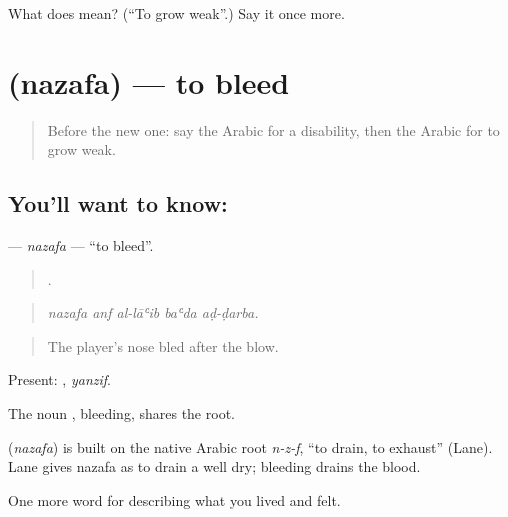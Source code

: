\begin{tcolorbox}[breakable,colback=teal!4,colframe=teal!35!black,title={Before you move on}]
What does  mean? (\textquotedblleft{}To grow weak\textquotedblright{}.) Say it once more.
\end{tcolorbox}
\section[\texorpdfstring{\ar{نزف} (nazafa)}{نزف (nazafa)}]{ (nazafa) — to bleed}

\label{lesson:AR-C513-nazafa}



\begin{quote}
Before the new one: say the Arabic for a disability, then the Arabic for to grow weak.
\end{quote}

\subsection*{You'll want to know: }
\textbf{} — \emph{nazafa} — \textquotedblleft{}to bleed\textquotedblright{}.

\begin{quote}
    .
\end{quote}

\begin{quote}
\emph{nazafa anf al-lāʿib baʿda aḍ-ḍarba.}
\end{quote}

\begin{quote}
The player's nose bled after the blow.
\end{quote}

Present: , \emph{yanzif}.

The noun , bleeding, shares the root.

\begin{cousinweb}
\textbf{} (\emph{nazafa}) is built on the native Arabic root \emph{n-z-f}, \textquotedblleft{}to drain, to exhaust\textquotedblright{} (Lane). Lane gives nazafa as to drain a well dry; bleeding drains the blood.
\end{cousinweb}

\begin{grammarlens}[title={What you've built}]
One more word for describing what you lived and felt.
\end{grammarlens}

